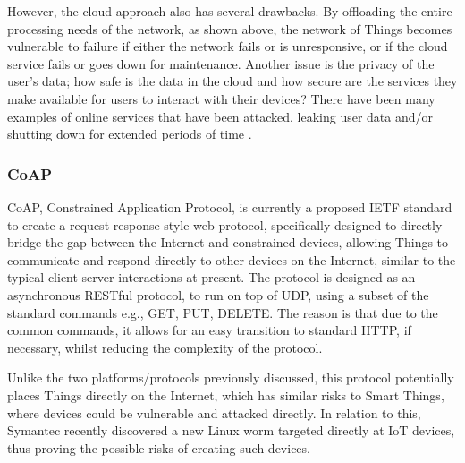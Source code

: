 However, the cloud approach also has several drawbacks. By offloading the entire processing needs of the network, as shown above, the network of Things becomes vulnerable to failure if either the network fails or is unresponsive, or if the cloud service fails or goes down for maintenance. Another issue is the privacy of the user's data; how safe is the data in the cloud and how secure are the services they make available for users to interact with their devices? There have been many examples of online services that have been attacked, leaking user data and/or shutting down for extended periods of time \cite{Playstation, Amazon, Google}.

\subsubsection{CoAP} %
\label{ssub:core_coap}
CoAP, Constrained Application Protocol\cite{IETF_COAP_HTTP}, is currently a proposed IETF standard to create a request-response style web protocol, specifically designed to directly bridge the gap between the Internet and constrained devices, allowing Things to communicate and respond directly to other devices on the Internet, similar to the typical client-server interactions at present. The protocol is designed as an asynchronous RESTful protocol, to run on top of UDP, using a subset of the standard commands e.g., GET, PUT, DELETE. The reason is that due to the common commands, it allows for an easy transition to standard HTTP, if necessary, whilst reducing the complexity of the protocol.

Unlike the two platforms/protocols previously discussed, this protocol potentially places Things directly on the Internet, which has similar risks to Smart Things, where devices could be vulnerable and attacked directly. In relation to this, Symantec recently discovered a new Linux worm\cite{IoTWorm} targeted directly at IoT devices, thus proving the possible risks of creating such devices.




